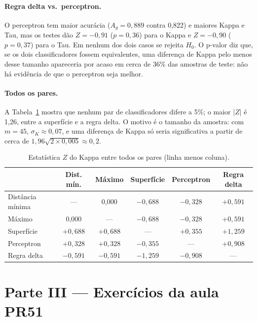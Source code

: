 \documentclass[12pt,a4paper]{article}
\begin{document}
\paragraph{Regra delta vs.\ perceptron.} O perceptron tem maior acurácia ($A_g = 0{,}889$ contra 0,822) e maiores Kappa e Tau, mas os testes dão $Z = -0{,}91$ ($p = 0{,}36$) para o Kappa e $Z = -0{,}90$ ($p = 0{,}37$) para o Tau. Em nenhum dos dois casos se rejeita $H_0$. O p-valor diz que, se os dois classificadores fossem equivalentes, uma diferença de Kappa pelo menos desse tamanho apareceria por acaso em cerca de 36\% das amostras de teste: não há evidência de que o perceptron seja melhor.

\paragraph{Todos os pares.} A Tabela~\ref{tab:z_todos} mostra que nenhum par de classificadores difere a 5\%; o maior $|Z|$ é 1,26, entre a superfície e a regra delta. O motivo é o tamanho da amostra: com $m = 45$, $\sigma_K \approx 0{,}07$, e uma diferença de Kappa só seria significativa a partir de cerca de $1{,}96\sqrt{2 \times 0{,}005} \approx 0{,}2$.

\begin{table}[H]
\centering
\caption{Estatística $Z$ do Kappa entre todos os pares (linha menos coluna).}
\label{tab:z_todos}
\small
\begin{tabular}{lccccc}
\toprule
 & Dist. mín. & Máximo & Superfície & Perceptron & Regra delta \\
\midrule
Distância mínima  & ---      & 0,000    & $-0{,}688$ & $-0{,}328$ & $+0{,}591$ \\
Máximo            & 0,000    & ---      & $-0{,}688$ & $-0{,}328$ & $+0{,}591$ \\
Superfície        & $+0{,}688$ & $+0{,}688$ & ---      & $+0{,}355$ & $+1{,}259$ \\
Perceptron        & $+0{,}328$ & $+0{,}328$ & $-0{,}355$ & ---      & $+0{,}908$ \\
Regra delta       & $-0{,}591$ & $-0{,}591$ & $-1{,}259$ & $-0{,}908$ & ---      \\
\bottomrule
\end{tabular}
\end{table}

\section{Parte III --- Exercícios da aula PR51}\label{sec:parte3}
\end{document}
